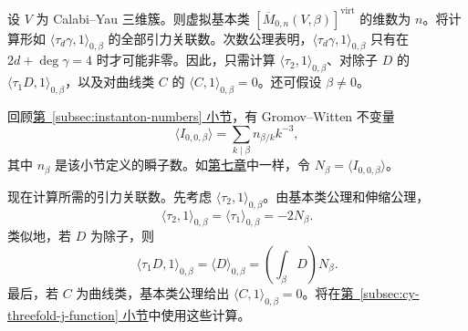 \begin{example}\label{ex:cy-threefold-gravitational}
设 $V$ 为 Calabi--Yau 三维簇。则虚拟基本类 $[\overline M_{0,n}(V,\beta)]^{\mathrm{virt}}$ 的维数为 $n$。将计算形如 $\langle\tau_d\gamma,1\rangle_{0,\beta}$ 的全部引力关联数。次数公理表明，$\langle\tau_d\gamma,1\rangle_{0,\beta}$ 只有在 $2d+\deg\gamma=4$ 时才可能非零。因此，只需计算 $\langle\tau_2,1\rangle_{0,\beta}$、对除子 $D$ 的 $\langle\tau_1D,1\rangle_{0,\beta}$，以及对曲线类 $C$ 的 $\langle C,1\rangle_{0,\beta}=0$。还可假设 $\beta\ne0$。

回顾\hyperref[subsec:instanton-numbers]{第~\ref*{subsec:instanton-numbers} 小节}，有 Gromov--Witten 不变量
\[
\langle I_{0,0,\beta}\rangle=\sum_{k\mid\beta}n_{\beta/k}k^{-3},
\]
其中 $n_\beta$ 是该小节定义的瞬子数。如\hyperref[chap:gromov-witten]{第七章}中一样，令 $N_\beta=\langle I_{0,0,\beta}\rangle$。

现在计算所需的引力关联数。先考虑 $\langle\tau_2,1\rangle_{0,\beta}$。由基本类公理和伸缩公理，
\[
\langle\tau_2,1\rangle_{0,\beta}
=\langle\tau_1\rangle_{0,\beta}=-2N_\beta.
\]
类似地，若 $D$ 为除子，则
\[
\langle\tau_1D,1\rangle_{0,\beta}
=\langle D\rangle_{0,\beta}
=\left(\int_\beta D\right)N_\beta.
\]
最后，若 $C$ 为曲线类，基本类公理给出 $\langle C,1\rangle_{0,\beta}=0$。将在\hyperref[subsec:cy-threefold-j-function]{第~\ref*{subsec:cy-threefold-j-function} 小节}中使用这些计算。
\end{example}

